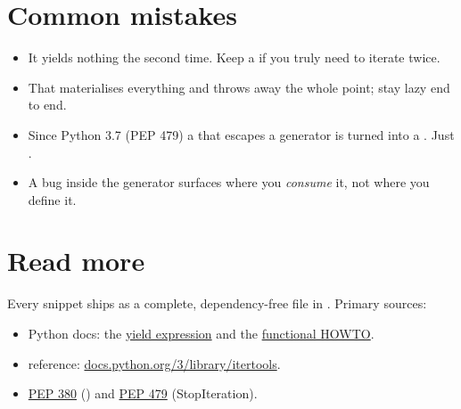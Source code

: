\section{Common mistakes}

\begin{itemize}
  \item {} It yields nothing the second time. Keep a  if you truly need to iterate twice.
  \item {} That materialises everything and throws away the whole point; stay lazy end to end.
  \item {} Since Python 3.7 (PEP 479) a  that escapes a generator is turned into a . Just .
  \item {} A bug inside the generator surfaces where you \emph{consume} it, not where you define it.
\end{itemize}

\section{Read more}

Every snippet ships as a complete, dependency-free file in . Primary sources:
\begin{itemize}
  \item Python docs: the \href{https://docs.python.org/3/reference/expressions.html\#yield-expressions}{yield expression} and the \href{https://docs.python.org/3/howto/functional.html}{functional HOWTO}.
  \item {} reference: \href{https://docs.python.org/3/library/itertools.html}{docs.python.org/3/library/itertools}.
  \item \href{https://peps.python.org/pep-0380/}{PEP 380} () and \href{https://peps.python.org/pep-0479/}{PEP 479} (StopIteration).
\end{itemize}



